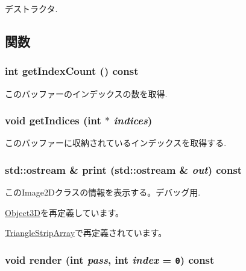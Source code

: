 デストラクタ. 

\subsection{関数}
\hypertarget{classm3g_1_1IndexBuffer_fe9ae2993ebcdb93d5ff26d57c81b73e}{
\subsubsection[{getIndexCount}]{\setlength{\rightskip}{0pt plus 5cm}int getIndexCount () const}}
\label{classm3g_1_1IndexBuffer_fe9ae2993ebcdb93d5ff26d57c81b73e}


このバッファーのインデックスの数を取得. \hypertarget{classm3g_1_1IndexBuffer_650953afac45099025a524ab160b911f}{
\subsubsection[{getIndices}]{\setlength{\rightskip}{0pt plus 5cm}void getIndices (int $\ast$ {\em indices})}}
\label{classm3g_1_1IndexBuffer_650953afac45099025a524ab160b911f}


このバッファーに収納されているインデックスを取得する. \hypertarget{classm3g_1_1IndexBuffer_6fea17fa1532df3794f8cb39cb4f911f}{
\subsubsection[{print}]{\setlength{\rightskip}{0pt plus 5cm}std::ostream \& print (std::ostream \& {\em out}) const}}
\label{classm3g_1_1IndexBuffer_6fea17fa1532df3794f8cb39cb4f911f}


このImage2Dクラスの情報を表示する。デバッグ用. 

\hyperlink{classm3g_1_1Object3D_6fea17fa1532df3794f8cb39cb4f911f}{Object3D}を再定義しています。

\hyperlink{classm3g_1_1TriangleStripArray_6fea17fa1532df3794f8cb39cb4f911f}{TriangleStripArray}で再定義されています。\hypertarget{classm3g_1_1IndexBuffer_1efcb1973989d9963d5bd6d03065d389}{
\subsubsection[{render}]{\setlength{\rightskip}{0pt plus 5cm}void render (int {\em pass}, \/  int {\em index} = {\tt 0}) const}}
\label{classm3g_1_1IndexBuffer_1efcb1973989d9963d5bd6d03065d389}



